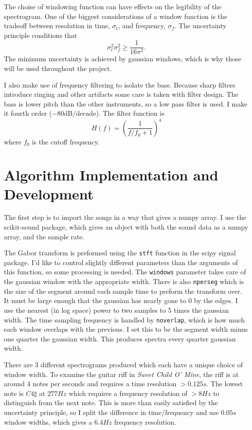 \documentclass{article}
\begin{document}
    The choise of windowing function can have effects on the legibility of the spectrogram. One of the biggest considerations of a window function is the tradeoff between resolution in time, $\sigma_t$, and frequency, $\sigma_f$. The uncertainty principle conditions that 
    \begin{equation}
        \sigma_t^2 \sigma_f^2 \geq \frac{1}{16 \pi^2}.
    \end{equation}
    The minimum uncertainty is achieved by gaussian windows, which is why those will be used throughout the project.

    I also make use of frequency filtering to isolate the bass. Because sharp filters introduce ringing and other artifacts some care is taken with filter design. The bass is lower pitch than the other instruments, so a low pass filter is used. I make it fourth order ($-80 \textrm{dB}/\textrm{decade}$). The filter function is
    \begin{equation}
        H(f) = \left( \frac{1}{f/f_0 + 1} \right)^4
    \end{equation}
    where $f_0$ is the cutoff frequency.

    \section{Algorithm Implementation and Development}
    The first step is to import the songs in a way that gives a numpy array. I use the scikit-sound package, which gives an object with both the sound data as a numpy array, and the sample rate.

    The Gabor transform is preformed using the \lstinline{stft} function in the scipy signal package. I'd like to control slightly different parameters than the arguments of this function, so some processing is needed. The \lstinline{windows} parameter takes care of the gaussian window with the appropriate width. There is also \lstinline{nperseg} which is the size of the segment around each sample time to preform the transform over. It must be large enough that the gaussian has nearly gone to 0 by the edges. I use the nearest (in log space) power to two samples to 5 times the gaussian width. The time sampling frequency is handled by \lstinline{noverlap}, which is how much each window overlaps with the previous. I set this to be the segment width minus one quarter the gaussian width. This produces spectra every quarter gaussian width.

    There are 3 different spectrograms produced which each have a unique choice of window width. To examine the guitar riff in \textit{Sweet Child O' Mine}, the riff is at around 4 notes per seconds and requires a time resolution $ > 0.125 \si{s}$. The lowest note is $C4 \sharp$ at $277 \si{Hz}$ which requires a frequency resolution of $> 8 \si{Hz}$ to distinguish from the next note. This is more than easily satisfied by the uncertainty principle, so I split the difference in time/frequency and use $0.05 \si{s}$ window widths, which gives a $6.4 \si{Hz}$ frequency resolution.
\end{document}
